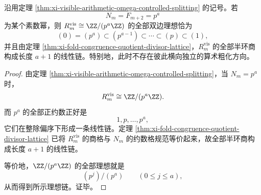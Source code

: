\begin{corollary}[素数幂分辨率上的商格单链化]\label{cor:xi-visible-arithmetic-primepower-quotient-chain}
沿用定理 \ref{thm:xi-visible-arithmetic-omega-controlled-splitting} 的记号。若
\[
N_m=F_{m+2}=p^a
\]
为某个素数幂，则 \(R_m^{\mathrm{vis}}\cong \ZZ/(p^a\ZZ)\) 的全部双边理想恰为
\[
(0)=(p^a)\subset (p^{a-1})\subset \cdots \subset (p)\subset (1),
\]
并且由定理 \ref{thm:xi-fold-congruence-quotient-divisor-lattice}，\(R_m^{\mathrm{vis}}\) 的全部半环商构成长度 \(a+1\) 的线性链。特别地，此时不存在彼此横向独立的算术粗化方向。
\end{corollary}
\begin{proof}
由定理 \ref{thm:xi-visible-arithmetic-omega-controlled-splitting}，当 \(N_m=p^a\) 时，
\[
R_m^{\mathrm{vis}}\cong \ZZ/(p^a\ZZ).
\]
而 \(p^a\) 的全部正约数正好是
\[
1,p,\dots,p^a,
\]
它们在整除偏序下形成一条线性链。定理 \ref{thm:xi-fold-congruence-quotient-divisor-lattice} 已将 \(R_m^{\mathrm{vis}}\) 的商格与 \(N_m\) 的约数格规范等价起来，故全部半环商构成长度 \(a+1\) 的线性链。

等价地，\(\ZZ/(p^a\ZZ)\) 的全部理想就是
\[
(p^j)/(p^a)
\qquad
(0\le j\le a),
\]
从而得到所示理想链。证毕。
\end{proof}















